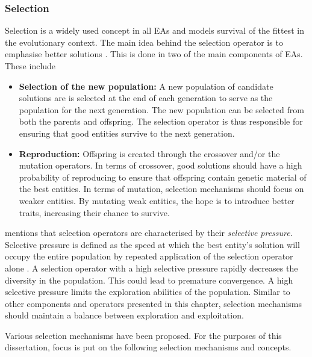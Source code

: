 \subsubsection{Selection}
\label{sec:heuristics:mh:ga:selection}

Selection is a widely used concept in all \acp{EA} and models survival of the fittest in the evolutionary context. The main idea behind the selection operator is to emphasise better solutions \cite{ref:engelbrecht:2007}. This is done in two of the main components of \acp{EA}. These include

\begin{itemize}
      \item \textbf{Selection of the new population: } A new population of candidate solutions are is selected at the end of each generation to serve as the population for the next generation. The new population can be selected from both the parents and offspring. The selection operator is thus responsible for ensuring that good entities survive to the next generation.

      \item \textbf{Reproduction: } Offspring is created through the crossover and/or the mutation operators. In terms of crossover, good solutions should have a high probability of reproducing to ensure that offspring contain genetic material of the best entities. In terms of mutation, selection mechanisms should focus on weaker entities. By mutating weak entities, the hope is to introduce better traits, increasing their chance to survive.
\end{itemize}

\citeauthor{ref:engelbrecht:2007}\cite{ref:engelbrecht:2007} mentions that selection operators are characterised by their \textit{selective pressure}. Selective pressure is defined as the speed at which the best entity's solution will occupy the entire population by repeated application of the selection operator alone \cite{ref:back:1994}. A selection operator with a high selective pressure rapidly decreases the diversity in the population. This could lead to premature convergence. A high selective pressure limits the exploration abilities of the population. Similar to other components and operators presented in this chapter, selection mechanisms should maintain a balance between exploration and exploitation.

Various selection mechanisms have been proposed. For the purposes of this dissertation, focus is put on the following selection mechanisms and concepts.

